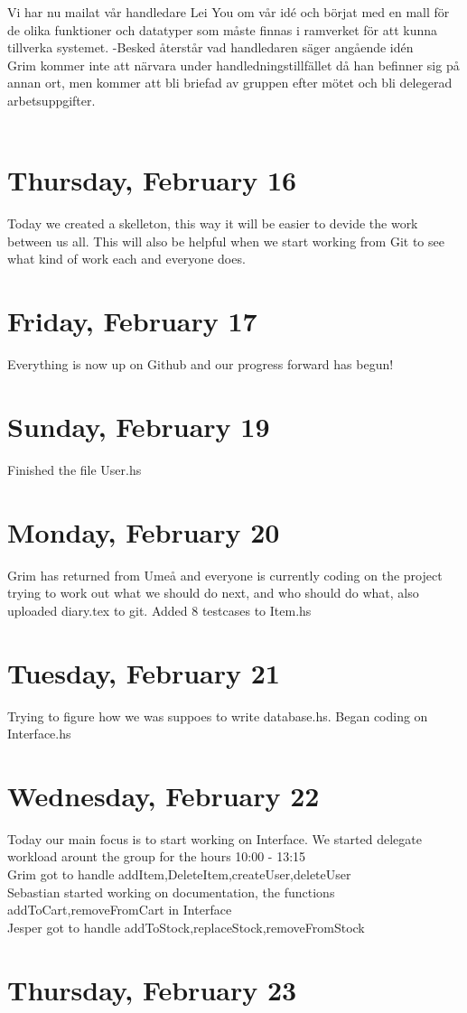 \documentclass[11pt]{article}
\begin{document}
Vi har nu mailat vår handledare Lei You om vår idé och börjat med en mall för de olika funktioner och datatyper som måste finnas i ramverket för att kunna tillverka systemet.
-Besked återstår vad handledaren säger angående idén\\

Grim kommer inte att närvara under handledningstillfället då han befinner sig på annan ort, men kommer att bli briefad av gruppen efter mötet och bli delegerad arbetsuppgifter.\\\\
\section*{Thursday, February 16}
Today we created a skelleton, this way it will be easier to devide the work between us all. This will also be helpful when we start working from Git to see what kind of work each and everyone does.

\section*{Friday, February 17}
Everything is now up on Github and our progress forward has begun!
\section*{Sunday, February 19}
Finished the file User.hs
\section*{Monday, February 20}
Grim has returned from Umeå and everyone is currently coding on the project trying to work out what we should do next, and who should do what, also uploaded diary.tex to git. Added 8 testcases to Item.hs
\section*{Tuesday, February 21}
Trying to figure how we was suppoes to write database.hs. Began coding on Interface.hs
\section*{Wednesday, February 22}
Today our main focus is to start working on Interface. We started delegate workload arount the group for the hours 10:00 - 13:15 \\
Grim got to handle addItem,DeleteItem,createUser,deleteUser \\
Sebastian started working on documentation, the functions addToCart,removeFromCart in Interface \\
Jesper got to handle addToStock,replaceStock,removeFromStock \\
\section*{Thursday, February 23}
\end{document}
